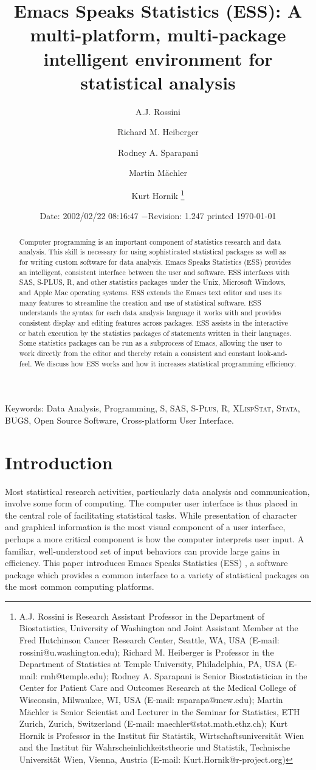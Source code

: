 \documentclass{article}
\title{Emacs Speaks Statistics (ESS): A multi-platform, multi-package
intelligent environment for statistical analysis}
\author{A.J. Rossini \and Richard M. Heiberger \and Rodney A. Sparapani
\and Martin M{\"a}chler \and Kurt Hornik \footnote{%
    A.J. Rossini is Research Assistant Professor in the Department of
    Biostatistics, University of Washington and Joint Assistant Member at
    the Fred Hutchinson Cancer Research Center, Seattle, WA, USA
    (E-mail: rossini@u.washington.edu);
    Richard M. Heiberger is Professor in the Department of Statistics at
    Temple University, Philadelphia, PA, USA (E-mail: rmh@temple.edu);
    Rodney A. Sparapani is Senior Biostatistician in the Center for Patient
    Care and Outcomes Research at the Medical College of Wisconsin, 
    Milwaukee, WI, USA (E-mail: rsparapa@mcw.edu);
    Martin M{\"a}chler is Senior Scientist and Lecturer in the Seminar for
    Statistics, ETH Zurich, Zurich, Switzerland
    (E-mail: maechler@stat.math.ethz.ch);
    Kurt Hornik is Professor in the Institut f{\"u}r Statistik,
    Wirtschaftsuniversit{\"a}t Wien and the Institut f{\"u}r
    Wahrscheinlichkeitstheorie und Statistik, Technische Universit{\"a}t
    Wien, Vienna, Austria (E-mail: Kurt.Hornik@r-project.org)}}
\date{$ $Date: 2002/02/22 08:16:47 $ - $Revision: 1.247 $ $\tiny printed \today}
\newif\ifdraft
\renewcommand{\baselinestretch}{1.5}
\newcommand*{\SAS}{\textsc{SAS}}
\newcommand*{\Splus}{\textsc{S-Plus}}
\newcommand*{\XLispStat}{\textsc{XLispStat}}
\newcommand*{\Stata}{\textsc{Stata}}
\begin{document}

\ifdraft
\setcounter{page}{0}
\tableofcontents
\fi

\maketitle

\ifdraft{}%
\else%
 \renewcommand{\baselinestretch}{1.5}
\fi

\begin{abstract}
  Computer programming is an important component of statistics
  research and data analysis.  This skill is necessary for using
  sophisticated statistical packages as well as for writing custom
  software for data analysis.  Emacs Speaks Statistics (ESS) provides
  an intelligent, consistent interface between the user and software.
  ESS interfaces with SAS, S-PLUS, R, and other statistics packages
  under the Unix, Microsoft Windows, and Apple Mac operating
  systems.  ESS extends the Emacs text editor and uses its many
  features to streamline the creation and use of statistical software.
  ESS understands the syntax for each data analysis language it works
  with and provides consistent display and editing features across
  packages.  ESS assists in the interactive or batch execution by the
  statistics packages of statements written in their languages.  Some
  statistics packages can be run as a subprocess of Emacs, allowing
  the user to work directly from the editor and thereby retain a
  consistent and constant look-and-feel.  We discuss how ESS works and
  how it increases statistical programming efficiency.
\end{abstract}

\noindent Keywords: Data Analysis, Programming, 
S, \SAS, \Splus, R, \XLispStat, \Stata, BUGS, Open Source Software,
Cross-platform User Interface.

\section{Introduction}
\label{sec:introduction}

Most statistical research activities, particularly data analysis and
communication, involve some form of computing.  The computer user
interface is thus placed in the central role of facilitating
statistical tasks.  While presentation of character and graphical
information is the most visual component of a user interface,
perhaps a more critical component is how the computer interprets user
input.  A familiar, well-understood set of input behaviors can provide
large gains in efficiency.  This paper introduces Emacs Speaks
Statistics (ESS) \citep{ESS}, a software package which provides a
common interface to a variety of statistical packages on the most
common computing platforms.
\end{document}
